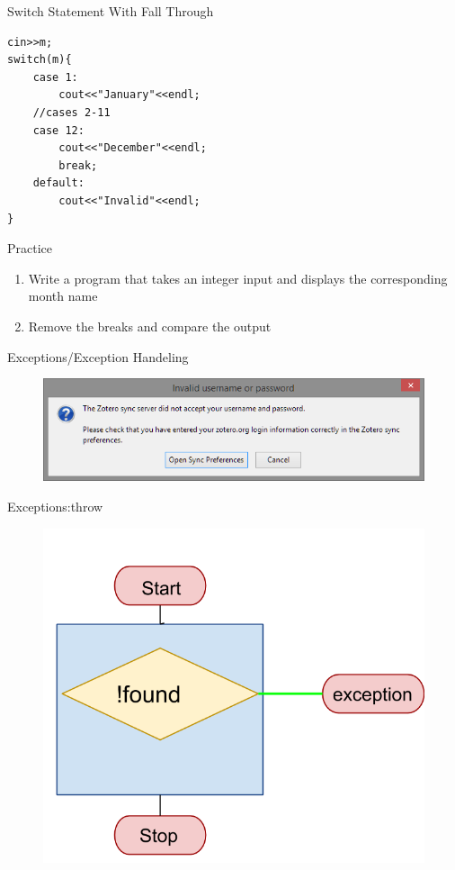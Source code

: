 \documentclass[xcolor={dvipsnames}]{beamer}
\begin{document}
\begin{frame}[fragile]{Switch Statement With Fall Through}
\begin{verbatim}
cin>>m;
switch(m){
    case 1: 
        cout<<"January"<<endl; 
    //cases 2-11
    case 12:
        cout<<"December"<<endl;
        break;
    default:
        cout<<"Invalid"<<endl;
}
\end{verbatim}
\end{frame}

\begin{frame}{Practice}
	\begin{enumerate}
		\item Write a program that takes an integer input and displays the corresponding month name 
		\item Remove the breaks and compare the output
	\end{enumerate}
\end{frame}

\begin{frame}{Exceptions/Exception Handeling}
\begin{center}	
	\begin{figure}
		\includegraphics[width=1\textwidth]{error}
	\end{figure}
\end{center}
\end{frame}

\begin{frame}{Exceptions:throw}
\begin{center}	
	\begin{figure}
		\includegraphics[width=.8\textwidth]{throw}
	\end{figure}
\end{center}
\end{frame}
\end{document}
